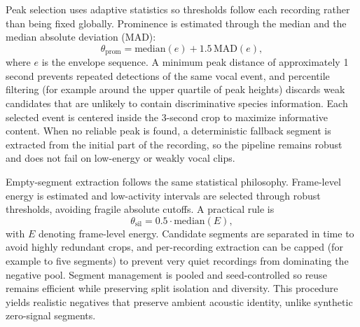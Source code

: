 \documentclass[a4paper,singleside,12pt]{report} %
\begin{document}
	Peak selection uses adaptive statistics so thresholds follow each recording rather than being fixed globally. Prominence is estimated through the median and the median absolute deviation (MAD):
	\begin{equation}
		\theta_{\mathrm{prom}} = \mathrm{median}(e) + 1.5\,\mathrm{MAD}(e),
	\end{equation}
	where \(e\) is the envelope sequence. A minimum peak distance of approximately 1 second prevents repeated detections of the same vocal event, and percentile filtering (for example around the upper quartile of peak heights) discards weak candidates that are unlikely to contain discriminative species information. Each selected event is centered inside the 3-second crop to maximize informative content. When no reliable peak is found, a deterministic fallback segment is extracted from the initial part of the recording, so the pipeline remains robust and does not fail on low-energy or weakly vocal clips.

	Empty-segment extraction follows the same statistical philosophy. Frame-level energy is estimated and low-activity intervals are selected through robust thresholds, avoiding fragile absolute cutoffs. A practical rule is
	\begin{equation}
		\theta_{\mathrm{sil}} = 0.5 \cdot \mathrm{median}(E),
	\end{equation}
	with \(E\) denoting frame-level energy. Candidate segments are separated in time to avoid highly redundant crops, and per-recording extraction can be capped (for example to five segments) to prevent very quiet recordings from dominating the negative pool. Segment management is pooled and seed-controlled so reuse remains efficient while preserving split isolation and diversity. This procedure yields realistic negatives that preserve ambient acoustic identity, unlike synthetic zero-signal segments.
\end{document}

